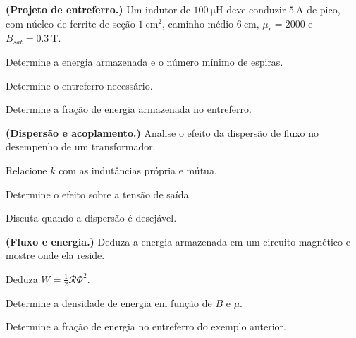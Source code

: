 \begin{questao}[4]{}

\textbf{(Projeto de entreferro.)} Um indutor de $\SI{100}{\micro\henry}$ deve
conduzir $\SI{5}{\ampere}$ de pico, com núcleo de ferrite de seção
$\SI{1}{\centi\meter\squared}$, caminho médio $\SI{6}{\centi\meter}$,
$\mu_r=2000$ e $B_{sat}=\SI{0.3}{\tesla}$.
\begin{itensq}
\item Determine a energia armazenada e o número mínimo de espiras.
\item Determine o entreferro necessário.
\item Determine a fração de energia armazenada no entreferro.
\end{itensq}


\end{questao}
\begin{questao}[4]{}

\textbf{(Dispersão e acoplamento.)} Analise o efeito da dispersão de fluxo no
desempenho de um transformador.
\begin{itensq}
\item Relacione $k$ com as indutâncias própria e mútua.
\item Determine o efeito sobre a tensão de saída.
\item Discuta quando a dispersão é desejável.
\end{itensq}


\end{questao}
\begin{questao}[4]{}

\textbf{(Fluxo e energia.)} Deduza a energia armazenada em um circuito
magnético e mostre onde ela reside.
\begin{itensq}
\item Deduza $W=\frac12\mathcal{R}\Phi^{2}$.
\item Determine a densidade de energia em função de $B$ e $\mu$.
\item Determine a fração de energia no entreferro do exemplo anterior.
\end{itensq}


\end{questao}
